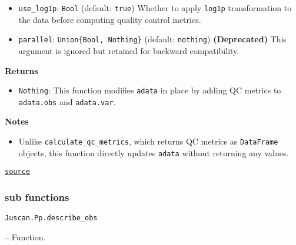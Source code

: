 \documentclass[oneside]{memoir}
\begin{document}
\begin{adjustwidth}{2em}{0pt}
\begin{itemize}
\item \texttt{use\_log1p}: \texttt{Bool} (default: \texttt{true})   Whether to apply \texttt{log1p} transformation to the data before computing quality control metrics.


\item \texttt{parallel}: \texttt{Union\{Bool, Nothing\}} (default: \texttt{nothing})   \textbf{(Deprecated)} This argument is ignored but retained for backward compatibility.

\end{itemize}
\textbf{Returns}

\begin{itemize}
\item \texttt{Nothing}:   This function modifies \texttt{adata} in place by adding QC metrics to \texttt{adata.obs} and \texttt{adata.var}.

\end{itemize}
\textbf{Notes}

\begin{itemize}
\item Unlike \texttt{calculate\_qc\_metrics}, which returns QC metrics as \texttt{DataFrame} objects,   this function directly updates \texttt{adata} without returning any values.

\end{itemize}


\href{https://github.com/zehua0417/Juscan.jl/blob/393ad1b827b678ea98a738f92af658ee9ed9a403/src/preprocessing/qc.jl#L87-L122}{\texttt{source}}


\end{adjustwidth}

\subsubsection{sub functions}



\label{7062540350669265862}{}

\hypertarget{18028582656875801779}{\texttt{Juscan.Pp.describe\_obs}}  -- {Function.}
\end{document}
